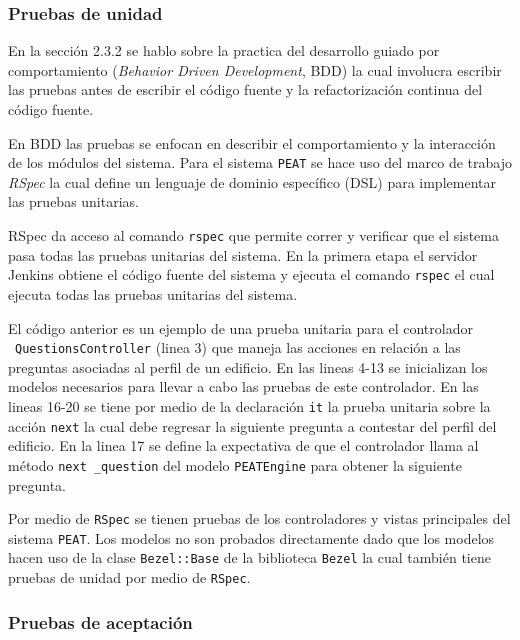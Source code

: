 \subsubsection{Pruebas de unidad}

En la sección 2.3.2 se hablo sobre la practica del desarrollo guiado por
comportamiento (\textit{Behavior Driven Development}, BDD) la cual involucra
escribir las pruebas antes de escribir el código fuente y la refactorización
continua del código fuente.

En BDD las pruebas se enfocan en describir el comportamiento y la interacción
de los módulos del sistema. Para el sistema \texttt{PEAT} se hace uso del marco
de trabajo \textit{RSpec} la cual define un lenguaje de dominio específico (DSL)
para implementar las pruebas unitarias.

RSpec da acceso al comando \texttt{rspec} que permite correr y verificar
que el sistema pasa todas las pruebas unitarias del sistema. En la primera
etapa el servidor Jenkins obtiene el código fuente del sistema y ejecuta el
comando \texttt{rspec} el cual ejecuta todas las pruebas unitarias del sistema.



El código anterior es un ejemplo de una prueba unitaria para el controlador
\ \texttt{QuestionsController} (linea 3) que maneja las acciones en relación
a las preguntas asociadas al perfil de un edificio. En las lineas 4-13 se
inicializan los modelos necesarios para llevar a cabo las pruebas de este
controlador.
En las lineas 16-20 se tiene por medio de la declaración \texttt{it} la
prueba unitaria sobre la acción \texttt{next} la cual debe regresar
la siguiente pregunta a contestar del perfil del edificio. En la linea
17 se define la expectativa de que el controlador llama al método \texttt{next
  \_question} del modelo \texttt{PEATEngine} para obtener la siguiente pregunta.

Por medio de \texttt{RSpec} se tienen pruebas de los controladores y vistas
principales del sistema \texttt{PEAT}. Los modelos no son probados directamente
dado que los modelos hacen uso de la clase \texttt{Bezel::Base} de la biblioteca
\texttt{Bezel} la cual también tiene pruebas de unidad por medio de \texttt{RSpec}.

\subsubsection{Pruebas de aceptación}

